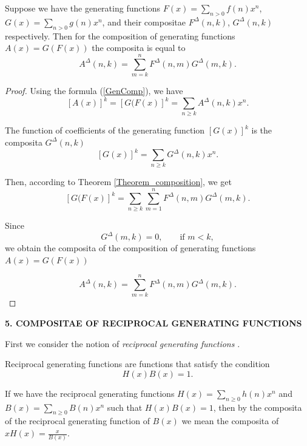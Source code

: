 \documentclass[12pt]{article}
\begin{document}
\begin{theorem}\label{CompozitProduct}  
Suppose we have the generating functions $F(x)=\sum_{n>0}f(n)x^n$, $G(x)=\sum_{n>0} g(n)x^n$, and their compositae $F^{\Delta}(n,k)$, $G^{\Delta}(n,k)$ respectively.
Then for the composition of generating functions $A(x)=G\left(F(x)\right)$  the composita is equal to 
\begin{equation}
\label{compCompositon}
A^{\Delta}(n,k)=\sum_{m=k}^n F^{\Delta}(n,m)G^{\Delta}(m,k).
\end{equation}
\end{theorem}

\begin{proof}
Using the formula (\ref{GenComp}), we have
$$
[A(x)]^k=[G(F(x)]^k=\sum_{n\geq  k} A^{\Delta}(n,k)x^n.
$$

The function of coefficients of the generating function $[G(x)]^k$ is the composita $G^{\Delta}(n,k)$
$$
[G(x)]^k=\sum_{n\geq  k} G^{\Delta}(n,k)x^n.
$$

Then, according to Theorem \ref{Theorem_composition}, we get
$$
[G(F(x)]^k=\sum_{n\geq k}\sum_{m=1}^n F^{\Delta}(n,m)G^{\Delta}(m,k).
$$

Since 
$$
G^{\Delta}(m,k)=0, \qquad \text{if $m<k$},
$$
we obtain the composita of the composition of generating functions $A(x)=G\left(F(x)\right)$

$$
A^{\Delta}(n,k)=\sum_{m=k}^n F^{\Delta}(n,m)G^{\Delta}(m,k).
$$
\end{proof}

\begin{center}
{\bf 5. COMPOSITAE OF RECIPROCAL GENERATING FUNCTIONS}
\end{center}

First we consider the notion of \textit{reciprocal generating functions} \cite{Wilf}.
\begin{definition}
\label{Recipro1}
Reciprocal generating functions are functions that satisfy the condition
$$
H(x)B(x)=1. 
$$
\end{definition}

\begin{remark}
If we have the reciprocal generating functions $H(x)=\sum_{n\geq 0} h(n)x^n$ and $B(x)=\sum_{n\geq 0} B(n)x^n$ such that $H(x)B(x)=1$, then by the composita of the reciprocal generating function of $B(x)$ we mean the composita of $xH(x)=\frac{x}{B(x)}$.
\end{remark}
\end{document}
